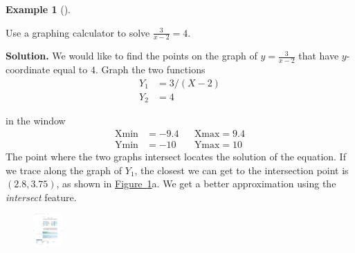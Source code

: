\documentclass[10pt,]{book}
\theoremstyle{plain}
\theoremstyle{definition}
\theoremstyle{definition}
\newtheorem{example}[theorem]{Example}
\theoremstyle{definition}
\newcommand{\amp}{ & }
\begin{document}
\begin{example}[]\label{example-GC-nonlinear-equation}

        Use a graphing calculator to solve \(\frac{3}{x −2}= 4.\)
\par\medskip\noindent%
\textbf{Solution.}\quad 
    We would like to find the points on the graph of \(y = \frac{3}{x −2}\) that have \(y\)-coordinate equal to \(4\). Graph the two functions
    \begin{align}
    Y_1 \amp = 3/(X − 2)  \\
    Y_2 \amp = 4
    \end{align}

    in the window
    \begin{align}
    \text{Xmin} \amp = −9.4 \amp\amp \text{Xmax} = 9.4\\
    \text{Ymin} \amp = −10 \amp\amp \text{Ymax} = 10
    \end{align}
    The point where the two graphs intersect locates the solution of the equation. If we trace along the graph of \(Y_1\), the closest we can get to the intersection point is \((2.8, 3.75)\), as shown in \hyperref[fig-GC-nonlinear]{Figure~\ref{fig-GC-nonlinear}}a. We get a better approximation using the \emph{intersect} feature.
    \leavevmode%
\begin{figure}
\centering
\includegraphics[width=0.100\textwidth,]{images/fig-GC-nonlinear.pdf}\caption{\label{fig-GC-nonlinear}}
\end{figure}



\end{example}
\end{document}
